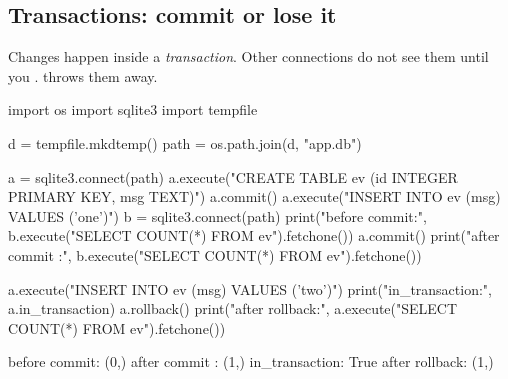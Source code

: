 \subsection{Transactions: commit or lose it}

Changes happen inside a \emph{transaction}. Other connections do not see them until you
.  throws them away.

\begin{center}
\end{center}

\begin{pycode}
import os
import sqlite3
import tempfile

d = tempfile.mkdtemp()
path = os.path.join(d, "app.db")

a = sqlite3.connect(path)
a.execute("CREATE TABLE ev (id INTEGER PRIMARY KEY, msg TEXT)")
a.commit()
a.execute("INSERT INTO ev (msg) VALUES ('one')")
b = sqlite3.connect(path)
print("before commit:", b.execute("SELECT COUNT(*) FROM ev").fetchone())
a.commit()
print("after commit :", b.execute("SELECT COUNT(*) FROM ev").fetchone())

a.execute("INSERT INTO ev (msg) VALUES ('two')")
print("in_transaction:", a.in_transaction)
a.rollback()
print("after rollback:", a.execute("SELECT COUNT(*) FROM ev").fetchone())
\end{pycode}
\begin{rawcode}
before commit: (0,)
after commit : (1,)
in_transaction: True
after rollback: (1,)
\end{rawcode}

